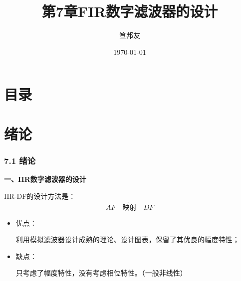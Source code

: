 \documentclass[notheorems,compress,mathserif,table]{beamer}
\title{\heiti 第7章\quad  FIR数字滤波器的设计}
\author[\textcolor{blue}]{{\sihao\kaishu  笪邦友}}
\institute{\sihao\lishu  \textcolor{violet}{中南民族大学~~ 电子信息工程学院}}
\date{\fangsong\today}
\begin{document}
	\kaishu
	\frame{ \titlepage }
	\section*{目录}
	
\section{绪论}
\begin{frame}\frametitle{7.1 绪论 }%
\begin{flushleft}
\textbf{一、IIR数字滤波器的设计}
\end{flushleft}

    IIR-DF的设计方法是：
    $$AF\underrightarrow{\quad \mbox{映射}\quad }DF$$

    \begin{itemize}
      \item 优点：\par 利用模拟滤波器设计成熟的理论、设计图表，保留了其优良的幅度特性；
      \item 缺点：\par 只考虑了幅度特性，没有考虑相位特性。（一般非线性）
    \end{itemize}

\end{frame}
\end{document}
